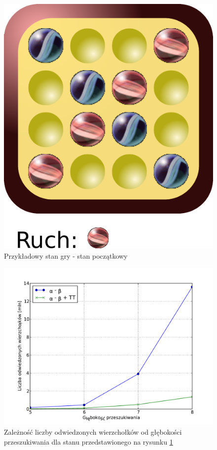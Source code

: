 \documentclass{scrartcl}
\begin{document}
\begin{figure}[h]
  \centering
  \includegraphics[scale=0.6]{data/position0.pdf}
  \caption{Przykładowy stan gry - stan początkowy}
  \label{fig:position0}
\end{figure}

\begin{table}[h]
  \centering
  \caption{Zestawienie wyników  pomiarów wydajności algorytmów dla stanu
    przedstawionego na rysunku \ref{fig:position0}}
  \label{table:position0}
  
\end{table}

\begin{figure}[h]
  \centering
  \includegraphics[scale=0.5]{data/results0.pdf}
  \caption{Zależność liczby odwiedzonych wierzchołków od głębokości
    przeszukiwania dla stanu przedstawionego na rysunku
    \ref{fig:position0}}
  \label{fig:results0}
\end{figure}
\end{document}
